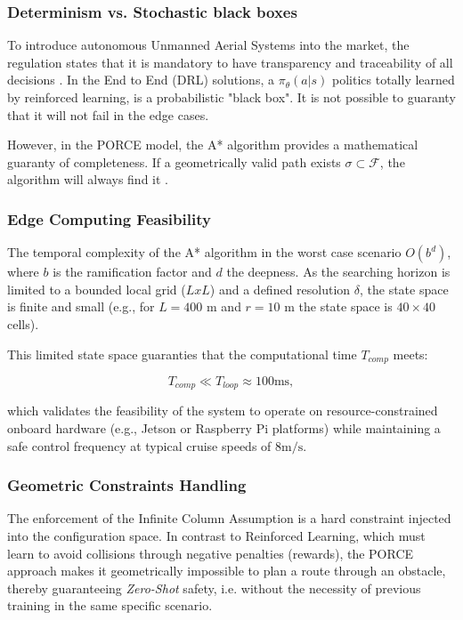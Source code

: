 \documentclass[a4paper, 11pt]{article}
\begin{document}
\subsubsection{Determinism vs. Stochastic black boxes}

To introduce autonomous Unmanned Aerial Systems into the market, the regulation states that it  is mandatory to have transparency and traceability of all decisions \cite{EASA_AI_Roadmap_2.0}. In the End to End (DRL) solutions, a $\pi_\theta(a|s)$ politics totally learned by reinforced learning, is a probabilistic "black box". It is not possible to guaranty that it will not fail in the edge cases. 

However, in the PORCE model, the A* algorithm provides a mathematical guaranty of completeness. If a geometrically valid path exists $\sigma \subset \mathcal{F}$, the algorithm will always find it . 

\subsubsection{Edge Computing Feasibility}

The temporal complexity of the A* algorithm in the worst case scenario $O(b^d)$, where $b$ is the ramification factor and $d$ the deepness. As the searching horizon is limited to a bounded local grid ($LxL$) and a defined resolution $\delta$, the state space is finite and small (e.g., for $L =400$ m and $r=10$ m the state space is $40 \times 40$ cells).

This limited state space guaranties that the computational time $T_{comp}$ meets: 

\begin{equation}
    T_{comp} \ll T_{loop} \approx 100\text{ms},
\end{equation} 

which validates the feasibility of the system to operate on resource-constrained onboard hardware (e.g., Jetson or Raspberry Pi platforms) while maintaining a safe control frequency at typical cruise speeds of $8\text{m/s}$. 

\subsubsection{Geometric Constraints Handling}

The enforcement of the {Infinite Column Assumption} is a hard constraint injected into the configuration space. In contrast to Reinforced Learning, which must learn to avoid collisions through negative penalties (rewards), the PORCE approach makes it geometrically impossible to plan a route through an obstacle, thereby guaranteeing \textit{Zero-Shot} safety, i.e. without the necessity of previous training in the same specific scenario. 
\end{document}
